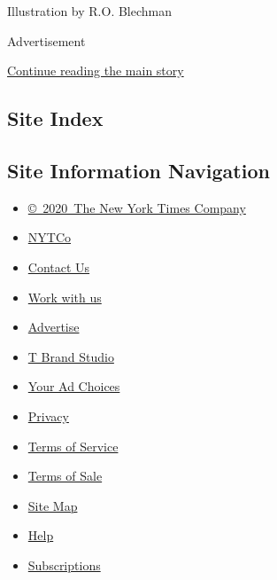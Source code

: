 Illustration by R.O. Blechman

Advertisement

\protect\hyperlink{after-bottom}{Continue reading the main story}

\hypertarget{site-index}{%
\subsection{Site Index}\label{site-index}}

\hypertarget{site-information-navigation}{%
\subsection{Site Information
Navigation}\label{site-information-navigation}}

\begin{itemize}
\tightlist
\item
  \href{https://help.nytimes.com/hc/en-us/articles/115014792127-Copyright-notice}{©~2020~The
  New York Times Company}
\end{itemize}

\begin{itemize}
\tightlist
\item
  \href{https://www.nytco.com/}{NYTCo}
\item
  \href{https://help.nytimes.com/hc/en-us/articles/115015385887-Contact-Us}{Contact
  Us}
\item
  \href{https://www.nytco.com/careers/}{Work with us}
\item
  \href{https://nytmediakit.com/}{Advertise}
\item
  \href{http://www.tbrandstudio.com/}{T Brand Studio}
\item
  \href{https://www.nytimes.com/privacy/cookie-policy\#how-do-i-manage-trackers}{Your
  Ad Choices}
\item
  \href{https://www.nytimes.com/privacy}{Privacy}
\item
  \href{https://help.nytimes.com/hc/en-us/articles/115014893428-Terms-of-service}{Terms
  of Service}
\item
  \href{https://help.nytimes.com/hc/en-us/articles/115014893968-Terms-of-sale}{Terms
  of Sale}
\item
  \href{https://spiderbites.nytimes.com}{Site Map}
\item
  \href{https://help.nytimes.com/hc/en-us}{Help}
\item
  \href{https://www.nytimes.com/subscription?campaignId=37WXW}{Subscriptions}
\end{itemize}

